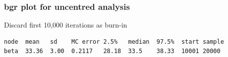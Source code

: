 \begin{frame}[t]

\begin{center}
\end{center}

\end{frame}


\begin{frame}[fragile,t]

\frametitle{bgr plot for uncentred analysis}
\begin{center}
\end{center}

Discard first 10,000 iterations as burn-in
\begin{footnotesize}
\begin{verbatim}
node  mean   sd    MC error 2.5%   median  97.5%  start sample
beta  33.36  3.00  0.2117   28.18  33.5    38.33  10001 20000
\end{verbatim}
\end{footnotesize}
\end{frame}


